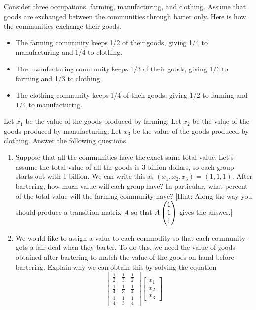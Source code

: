 \begin{problem}
Consider three occupations, farming, manufacturing, and clothing.  Assume that goods are exchanged between the communities through barter only. Here is how the communities exchange their goods.
\begin{itemize}
 \item The farming community keeps 1/2 of their goods, giving 1/4 to manufacturing and 1/4 to clothing.
 \item The manufacturing community keeps 1/3 of their goods, giving 1/3 to farming and 1/3 to clothing.
 \item The clothing community keeps 1/4 of their goods, giving 1/2 to farming and 1/4 to manufacturing.
\end{itemize}
Let $x_1$ be the value of the goods produced by farming. 
Let $x_2$ be the value of the goods produced by manufacturing. 
Let $x_3$ be the value of the goods produced by clothing. 
Answer the following questions.
\begin{enumerate}
\item Suppose that all the communities have the exact same total value.
Let's assume the total value of all the goods is 3 billion dollars, so each group starts out with 1 billion. We can write this as $(x_1,x_2,x_3) = (1,1,1)$. After bartering, how much value will each group have? 
In particular, what percent of the total value will the farming community have? 
[Hint: Along the way you should produce a transition matrix $A$ so that $A\pvec{1\\1\\1}$ gives the answer.]
\item We would like to assign a value to each commodity so that each community gets a fair deal when they barter. To do this, we need the value of goods obtained after bartering to match the value of the goods on hand before bartering.  Explain why we can obtain this by solving the equation
$$
\begin{bmatrix}
   \frac{1}{2}& \frac{1}{3}& \frac{1}{2}\\
   \frac{1}{4}& \frac{1}{3}& \frac{1}{4}\\
   \frac{1}{4}& \frac{1}{3}& \frac{1}{4}
  \end{bmatrix}
\begin{bmatrix}
 x_1\\x_2\\x_3

\end{bmatrix}$$
\end{enumerate}
\end{problem}
